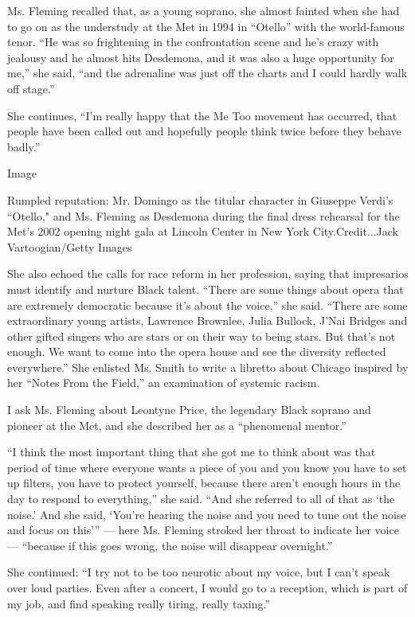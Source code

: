 Ms. Fleming recalled that, as a young soprano, she almost fainted when
she had to go on as the understudy at the Met in 1994 in ``Otello'' with
the world-famous tenor. ``He was so frightening in the confrontation
scene and he's crazy with jealousy and he almost hits Desdemona, and it
was also a huge opportunity for me,'' she said, ``and the adrenaline was
just off the charts and I could hardly walk off stage.''

She continues, ``I'm really happy that the Me Too movement has occurred,
that people have been called out and hopefully people think twice before
they behave badly.''

Image

Rumpled reputation: Mr. Domingo as the titular character in Giuseppe
Verdi's ``Otello," and Ms. Fleming as Desdemona during the final dress
rehearsal for the Met's 2002 opening night gala at Lincoln Center in New
York City.Credit...Jack Vartoogian/Getty Images

She also echoed the calls for race reform in her profession, saying that
impresarios must identify and nurture Black talent. ``There are some
things about opera that are extremely democratic because it's about the
voice,'' she said. ``There are some extraordinary young artists,
Lawrence Brownlee, Julia Bullock, J'Nai Bridges and other gifted singers
who are stars or on their way to being stars. But that's not enough. We
want to come into the opera house and see the diversity reflected
everywhere.'' She enlisted Ms. Smith to write a libretto about Chicago
inspired by her ``Notes From the Field,'' an examination of systemic
racism.

I ask Ms. Fleming about Leontyne Price, the legendary Black soprano and
pioneer at the Met, and she described her as a ``phenomenal mentor.''

``I think the most important thing that she got me to think about was
that period of time where everyone wants a piece of you and you know you
have to set up filters, you have to protect yourself, because there
aren't enough hours in the day to respond to everything,'' she said.
``And she referred to all of that as `the noise.' And she said, `You're
hearing the noise and you need to tune out the noise and focus on
this''' --- here Ms. Fleming stroked her throat to indicate her voice
--- ``because if this goes wrong, the noise will disappear overnight.''

She continued: ``I try not to be too neurotic about my voice, but I
can't speak over loud parties. Even after a concert, I would go to a
reception, which is part of my job, and find speaking really tiring,
really taxing.''

